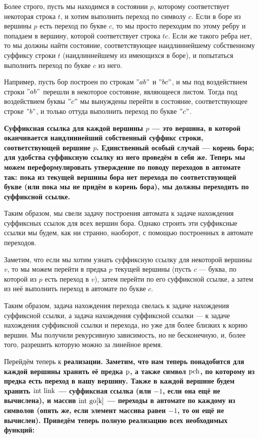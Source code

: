 Более строго, пусть мы находимся в состоянии $p$, которому соответствует некоторая строка $t$, и хотим выполнить переход по символу $c$. Если в боре из вершины $p$ есть переход по букве $c$, то мы просто переходим по этому ребру и попадаем в вершину, которой соответствует строка $tc$. Если же такого ребра нет, то мы должны найти состояние, соответствующее наидлиннейшему собственному суффиксу строки $t$ (наидлиннейшему из имеющихся в боре), и попытаться выполнить переход по букве $c$ из него.

Например, пусть бор построен по строкам $"ab"$ и $"bc"$, и мы под воздействием строки $"ab"$ перешли в некоторое состояние, являющееся листом. Тогда под воздействием буквы $"c"$ мы вынуждены перейти в состояние, соответствующее строке $"b"$, и только оттуда выполнить переход по букве $"c"$.

\bf{Суффиксная ссылка} для каждой вершины $p$ --- это вершина, в которой оканчивается наидлиннейший собственный суффикс строки, соответствующей вершине $p$. Единственный особый случай --- корень бора; для удобства суффиксную ссылку из него проведём в себя же. Теперь мы можем переформулировать утверждение по поводу переходов в автомате так: пока из текущей вершины бора нет перехода по соответствующей букве (или пока мы не придём в корень бора), мы должны переходить по суффиксной ссылке.

Таким образом, мы свели задачу построения автомата к задаче нахождения суффиксных ссылок для всех вершин бора. Однако строить эти суффиксные ссылки мы будем, как ни странно, наоборот, с помощью построенных в автомате переходов.

Заметим, что если мы хотим узнать суффиксную ссылку для некоторой вершины $v$, то мы можем перейти в предка $p$ текущей вершины (пусть $c$ --- буква, по которой из $p$ есть переход в $v$), затем перейти по его суффиксной ссылке, а затем из неё выполнить переход в автомате по букве $c$.

Таким образом, задача нахождения перехода свелась к задаче нахождения суффиксной ссылки, а задача нахождения суффиксной ссылки --- к задаче нахождения суффиксной ссылки и перехода, но уже для более близких к корню вершин. Мы получили рекурсивную зависимость, но не бесконечную, и, более того, разрешить которую можно за линейное время.

Перейдём теперь к \bf{реализации}. Заметим, что нам теперь понадобится для каждой вершины хранить её предка $\rm p$, а также символ $\rm pch$, по которому из предка есть переход в нашу вершину. Также в каждой вершине будем хранить $\rm int~link$ --- суффиксная ссылка (или $-1$, если она ещё не вычислена), и массив $\rm int~go[k]$ --- переходы в автомате по каждому из символов (опять же, если элемент массива равен $-1$, то он ещё не вычислен). Приведём теперь полную реализацию всех необходимых функций:

